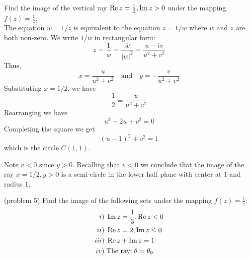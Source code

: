 \documentclass[handout]{ximera}
\begin{document}
\begin{example}[example 5]
Find the image of the vertical ray $\operatorname{Re} z = \frac12, \operatorname{Im} z > 0$ under the mapping $f(z) = \frac{1}{z}$.\\
The equation $w = 1/z$ is equivalent to the equation $z = 1/w$ where $w$ and $z$ are both non-zero.
We write $1/w$ in rectangular form:
\[
z = \frac{1}{w} = \frac{\overline{w}}{|w|^2} = \frac{u-iv}{u^2 + v^2}
\]
Thus,
\[
x = \frac{u}{u^2+v^2} \quad \text{and} \quad y = -\frac{v}{u^2+v^2}
\]
Substituting $x = 1/2$, we have
\[
\frac12 = \frac{u}{u^2+v^2}
\]
Rearranging we have
\[
u^2 - 2u + v^2 = 0
\]
Completing the square we get
\[
(u-1)^2 + v^2 = 1
\]
which is the circle $C(1,1)$.

Note $v < 0$ since $y > 0$.  Recalling that $v <0$
we conclude that the image of the ray $x = 1/2, y >0$ is a semi-circle in the lower half plane with 
center at $1$ and radius $1$.


\begin{image}
\end{image}

\end{example}


\begin{problem}(problem 5)
Find the image of the following sets under the mapping $f(z) = \frac{1}{z}$:
\begin{align*}
i)\; & \operatorname{Im} z = \frac13, \operatorname{Re} z < 0 \\
ii)\; & \operatorname{Re} z = 2, \operatorname{Im} z \leq 0 \\
iii)\; & \operatorname{Re} z + \operatorname{Im} z = 1 \\
iv)\; & \mbox{The ray:} \; \theta = \theta_0
\end{align*}
\end{problem}
\end{document}
